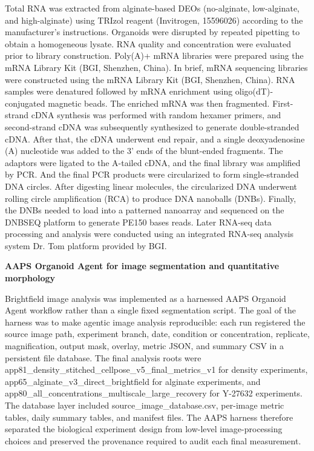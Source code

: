 \documentclass[
]{article}
\begin{document}
Total RNA was extracted from alginate-based DEOs (no-alginate, low-alginate, and high-alginate) using TRIzol reagent (Invitrogen, 15596026) according to the manufacturer's instructions. Organoids were disrupted by repeated pipetting to obtain a homogeneous lysate. RNA quality and concentration were evaluated prior to library construction. Poly(A)+ mRNA libraries were prepared using the mRNA Library Kit (BGI, Shenzhen, China). In brief, mRNA sequencing libraries were constructed using the mRNA Library Kit (BGI, Shenzhen, China). RNA samples were denatured followed by mRNA enrichment using oligo(dT)-conjugated magnetic beads. The enriched mRNA was then fragmented. First-strand cDNA synthesis was performed with random hexamer primers, and second-strand cDNA was subsequently synthesized to generate double-stranded cDNA. After that, the cDNA underwent end repair, and a single deoxyadenosine (A) nucleotide was added to the 3' ends of the blunt-ended fragments. The adaptors were ligated to the A-tailed cDNA, and the final library was amplified by PCR. And the final PCR products were circularized to form single-stranded DNA circles. After digesting linear molecules, the circularized DNA underwent rolling circle amplification (RCA) to produce DNA nanoballs (DNBs). Finally, the DNBs needed to load into a patterned nanoarray and sequenced on the DNBSEQ platform to generate PE150 bases reads. Later RNA-seq data processing and analysis were conducted using an integrated RNA-seq analysis system Dr. Tom platform provided by BGI.

\textbf{AAPS Organoid Agent for image segmentation and quantitative morphology}

Brightfield image analysis was implemented as a harnessed AAPS Organoid Agent workflow rather than a single fixed segmentation script. The goal of the harness was to make agentic image analysis reproducible: each run registered the source image path, experiment branch, date, condition or concentration, replicate, magnification, output mask, overlay, metric JSON, and summary CSV in a persistent file database. The final analysis roots were app81\_density\_stitched\_cellpose\_v5\_final\_metrics\_v1 for density experiments, app65\_alginate\_v3\_direct\_brightfield for alginate experiments, and app80\_all\_concentrations\_multiscale\_large\_recovery for Y-27632 experiments. The database layer included source\_image\_database.csv, per-image metric tables, daily summary tables, and manifest files. The AAPS harness therefore separated the biological experiment design from low-level image-processing choices and preserved the provenance required to audit each final measurement.
\end{document}
